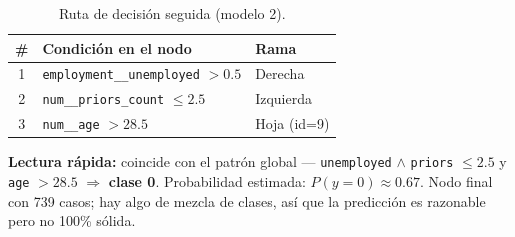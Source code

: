 \begin{table}[h]
\centering
\caption{Ruta de decisión seguida (modelo 2).}
\label{tab:local-path-1535}
\small
\begin{tabular}{@{}cll@{}}
\toprule
\# & \textbf{Condición en el nodo} & \textbf{Rama} \\
\midrule
1 & \texttt{employment\_\_unemployed} \(> 0.5\) & Derecha \\
2 & \texttt{num\_\_priors\_count} \(\le 2.5\)   & Izquierda \\
3 & \texttt{num\_\_age} \(> 28.5\)              & Hoja (id=9) \\
\bottomrule
\end{tabular}
\end{table}

\textbf{Lectura rápida:} coincide con el patrón global —
\texttt{unemployed} $\land$ \texttt{priors} $\le 2.5$ y \texttt{age} $> 28.5$ $\Rightarrow$ \textbf{clase 0}.
Probabilidad estimada: $P(y=0)\approx 0.67$.
Nodo final con 739 casos; hay algo de mezcla de clases, así que la predicción es razonable pero no 100\% sólida.

